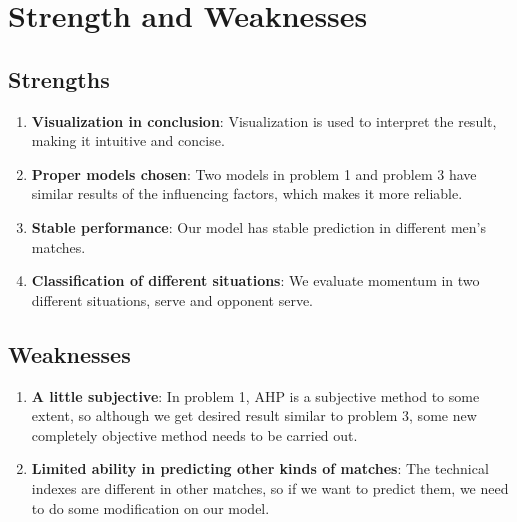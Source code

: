 \section{Strength and Weaknesses}

\subsection{Strengths}

\begin{enumerate}
    \item {\bf Visualization in conclusion}: Visualization is used to interpret the result, making it intuitive and concise.
    \item {\bf Proper models chosen}: Two models in problem 1 and problem 3 have similar results of the influencing factors, which makes it more reliable.
    \item {\bf Stable performance}: Our model has stable prediction in different men's matches.
    \item {\bf Classification of different situations}: We evaluate momentum in two different situations, serve and opponent serve.
\end{enumerate}


\subsection{Weaknesses}

\begin{enumerate}
    \item {\bf A little subjective}: In problem 1, AHP is a subjective method to some extent, so although we get desired result similar to problem 3,
    some new completely objective method needs to be carried out.
    \item {\bf Limited ability in predicting other kinds of matches}: The technical indexes are different in other matches, so if we want to predict them, 
    we need to do some modification on our model.
\end{enumerate}